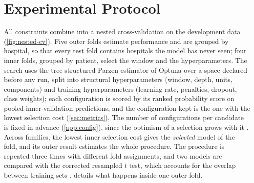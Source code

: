 \section{Experimental Protocol}\label{sec:evaluation}\label{sec:training}\label{sec:cv-structure}\label{sec:repeats}

All constraints combine into a nested cross-validation on the development data (\cref{fig:nested-cv}). Five outer folds estimate performance and are grouped by hospital, so that every test fold contains hospitals the model has never seen; four inner folds, grouped by patient, select the window and the hyperparameters. The search uses the tree-structured Parzen estimator of Optuna \parencite{bergstra2011,akiba2019} over a space declared before any run, split into structural hyperparameters (window, depth, units, components) and training hyperparameters (learning rate, penalties, dropout, class weights); each configuration is scored by its ranked probability score on pooled inner-validation predictions, and the configuration kept is the one with the lowest selection cost (\cref{sec:metrics}). The number of configurations per candidate is fixed in advance (\cref{app:config}), since the optimism of a selection grows with it \parencite{cawley2010}. Across families, the lowest inner selection cost gives the \emph{selected} model of the fold, and its outer result estimates the whole procedure. The procedure is repeated three times with different fold assignments, and two models are compared with the corrected resampled $t$ test, which accounts for the overlap between training sets \parencite{nadeau2003}.  details what happens inside one outer fold.

